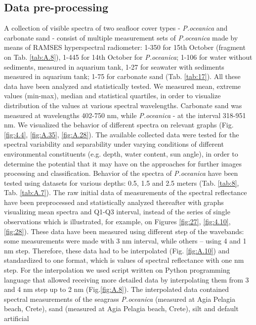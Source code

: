 \documentclass[11pt]{article}
\begin{document}
\subsection{Data pre-processing}
A collection of visible spectra of two seafloor cover types - \textit{P.oceanica} and carbonate sand - consist of multiple measurement sets of \textit{P.oceanica} made by means of RAMSES hyperspectral radiometer: 1-350 for 15th October (fragment on Tab. \ref{tab:A.8}), 1-445 for 14th October for 	\textit{P.oceanica}; 1-106 for water without sediments, measured in aquarium tank, 1-27 for seawater with sediments measured in aquarium tank; 1-75 for carbonate sand (Tab. \ref{tab:17}). All these data have been analyzed and statistically tested. We measured mean, extreme values (min-max), median and statistical quartiles, in order to visualize distribution of the values at various spectral wavelengths. Carbonate sand was measured at wavelengths 402-750 nm, while \textit{P.oceanica} - at the interval 318-951 nm. We visualized the behavior of different spectra on relevant graphs (Fig. \ref{fig:4.4}, \ref{fig:A.35}, \ref{fig:A.28}). 
The available collected data were tested for the spectral variability and separability under varying conditions of different environmental
constituents (e.g. depth, water content, sun angle), in order to determine the
potential that it may have on the approaches for further images processing and classification. Behavior of the spectra of \textit{P.oceanica} have been tested using datasets for various depths: 0.5, 1.5 and 2.5 meters (Tab. \ref{tab:8}, Tab. \ref{tab:A.7}). The raw
initial data of measurements of the spectral reflectance have been preprocessed and statistically analyzed thereafter with graphs visualizing mean spectra and Q1-Q3 interval, instead of the series of single observations which is illustrated, for example, on Figures \ref{fig:27}, \ref{fig:4.10}, \ref{fig:28}). These data
have been measured using different step of the wavebands: some measurements
were made with 3 nm interval, while others – using 4 and 1 nm step.
Therefore, these data had to be interpolated (Fig. \ref{fig:A.10}) and standardized to one
format, which is values of spectral reflectance with one nm step. For the
interpolation we used script written on Python programming language that allowed receiving more 
detailed data by interpolating them from 3 and 4 nm step up to 2 nm (Fig.\ref{fig:A.8}).
The interpolated data contained spectral measurements of the seagrass 	\textit{P.oceanica} (measured at Agia
Pelagia beach, Crete), sand (measured at Agia Pelagia beach, Crete), silt and default artificial
\end{document}
